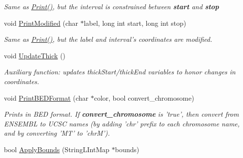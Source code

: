 \begin{DoxyCompactItemize}
\begin{DoxyCompactList}\small\item\em Same as \hyperlink{classGenomicRegionBED_affbd8eb279f10f9b45189e2388fe7e89}{Print()}, but the interval is constrained between {\bfseries start} and {\bfseries stop} \end{DoxyCompactList}\item 
\hypertarget{classGenomicRegionBED_aaebba3c31c0fa88e594706f490030549}{
void \hyperlink{classGenomicRegionBED_aaebba3c31c0fa88e594706f490030549}{PrintModified} (char $\ast$label, long int start, long int stop)}
\label{classGenomicRegionBED_aaebba3c31c0fa88e594706f490030549}

\begin{DoxyCompactList}\small\item\em Same as \hyperlink{classGenomicRegionBED_affbd8eb279f10f9b45189e2388fe7e89}{Print()}, but the label and interval's coordinates are modified. \end{DoxyCompactList}\item 
\hypertarget{classGenomicRegionBED_a01bd886cfa67a3adae10c67dee941924}{
void \hyperlink{classGenomicRegionBED_a01bd886cfa67a3adae10c67dee941924}{UpdateThick} ()}
\label{classGenomicRegionBED_a01bd886cfa67a3adae10c67dee941924}

\begin{DoxyCompactList}\small\item\em Auxiliary function: updates thickStart/thickEnd variables to honor changes in coordinates. \end{DoxyCompactList}\item 
\hypertarget{classGenomicRegionBED_a513fb071e2626be58837052daf86bab5}{
void \hyperlink{classGenomicRegionBED_a513fb071e2626be58837052daf86bab5}{PrintBEDFormat} (char $\ast$color, bool convert\_\-chromosome)}
\label{classGenomicRegionBED_a513fb071e2626be58837052daf86bab5}

\begin{DoxyCompactList}\small\item\em Prints in BED format. If {\bfseries convert\_\-chromosome} is 'true', then convert from ENSEMBL to UCSC names (by adding 'chr' prefix to each chromosome name, and by converting 'MT' to 'chrM'). \end{DoxyCompactList}\item 
\hypertarget{classGenomicRegionBED_ad9ec9c8dd69ee078fde940463ad46e1e}{
bool \hyperlink{classGenomicRegionBED_ad9ec9c8dd69ee078fde940463ad46e1e}{ApplyBounds} (StringLIntMap $\ast$bounds)}
\label{classGenomicRegionBED_ad9ec9c8dd69ee078fde940463ad46e1e}


\end{DoxyCompactItemize}
